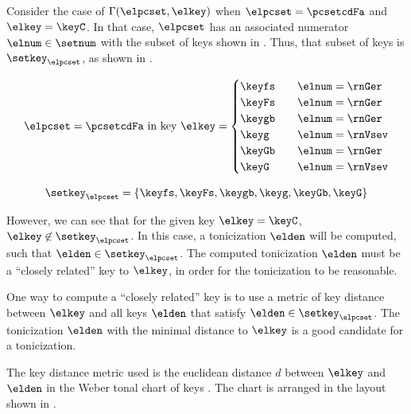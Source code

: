 
Consider the case of $\Gamma(\elpcset, \elkey)$ when
$\elpcset = \pcsetcdFa$ and $\elkey = \keyC$. In that case,
$\elpcset$ has an associated numerator $\elnum \in \setnum$
with the subset of keys shown in .
Thus, that subset of keys is $\setkey_\elpcset$, as shown in
. 

\begin{equation}
    \label{eq:key_not_found}
    \elpcset = \pcsetcdFa \text{ in key } \elkey =
    \begin{cases}
        \keyfs & \quad \elnum = \rnGer \\
        \keyFs & \quad \elnum = \rnGer \\
        \keygb & \quad \elnum = \rnGer \\
        \keyg  & \quad \elnum = \rnVsev \\
        \keyGb & \quad \elnum = \rnGer \\
        \keyG  & \quad \elnum = \rnVsev \\
    \end{cases}
\end{equation}

\begin{equation}
    \label{eq:key_not_found2}
    \setkey_\elpcset = \{ \keyfs, \keyFs, \keygb, \keyg, \keyGb, \keyG \}
\end{equation}

However, we can see that for the given key $\elkey = \keyC$,
$\elkey \not\in \setkey_\elpcset$. In this case, a
tonicization $\elden$ will be computed, such that $\elden
\in \setkey_\elpcset$. The computed tonicization $\elden$
must be a ``closely related'' key to $\elkey$, in order for
the tonicization to be reasonable.

One way to compute a ``closely related'' key is to use a
metric of key distance between $\elkey$ and all keys
$\elden$ that satisfy $\elden \in \setkey_\elpcset$. The
tonicization $\elden$ with the minimal distance to $\elkey$
is a good candidate for a tonicization.

The key distance metric used is the euclidean distance $d$
between $\elkey$ and $\elden$ in the Weber tonal chart of
keys \parencite{weber1818versuch}. The chart is arranged in
the layout shown in .


